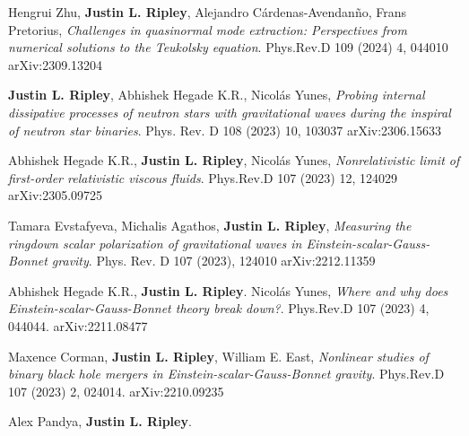 \documentclass{my_cv}
\begin{document}
\begin{etaremune}
\item Hengrui Zhu, {\bf Justin L. Ripley}, Alejandro C\'ardenas-Avendan\~no, Frans Pretorius, 
    \emph{Challenges in quasinormal mode extraction: Perspectives from numerical solutions to the Teukolsky equation}.
    Phys.Rev.D 109 (2024) 4, 044010  
    arXiv:2309.13204
\item {\bf Justin L. Ripley}, Abhishek Hegade K.R., Nicol\'{a}s Yunes, 
    \emph{Probing internal dissipative processes of neutron stars with gravitational waves during the inspiral of neutron star binaries}.
    Phys. Rev. D 108 (2023) 10, 103037  
    arXiv:2306.15633
\item Abhishek Hegade K.R., {\bf Justin L. Ripley}, Nicol\'{a}s Yunes, 
    \emph{Nonrelativistic limit of first-order relativistic viscous fluids}.
    Phys.Rev.D 107 (2023) 12, 124029 
    arXiv:2305.09725
\item Tamara Evstafyeva, Michalis Agathos, {\bf Justin L. Ripley}, 
    \emph{Measuring the ringdown scalar polarization of gravitational waves in 
    Einstein-scalar-Gauss-Bonnet gravity}.
    Phys. Rev. D 107 (2023), 124010
    arXiv:2212.11359
\item Abhishek Hegade K.R., {\bf Justin L. Ripley}. Nicol\'{a}s Yunes, 
    \emph{Where and why does Einstein-scalar-Gauss-Bonnet theory break down?}.
    Phys.Rev.D 107 (2023) 4, 044044.
    arXiv:2211.08477
\item Maxence Corman, {\bf Justin L. Ripley}, William E. East, 
   \emph{Nonlinear studies of binary black hole mergers in 
   Einstein-scalar-Gauss-Bonnet gravity}.
   Phys.Rev.D 107 (2023) 2, 024014. 
   arXiv:2210.09235
\item Alex Pandya, {\bf Justin L. Ripley}. 

\end{etaremune}
\end{document}

